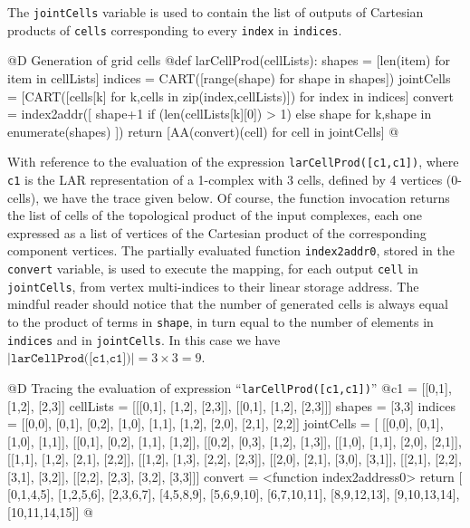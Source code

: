 \documentclass[11pt,oneside]{article}	%
\begin{document}
The \texttt{jointCells} variable is used to contain the list of outputs of Cartesian products of \texttt{cells} corresponding to every \texttt{index} in \texttt{indices}.

@D Generation of grid cells 
@{def larCellProd(cellLists):
    shapes = [len(item) for item in cellLists]
    indices = CART([range(shape) for shape in shapes])
    jointCells = [CART([cells[k] for k,cells in zip(index,cellLists)])
                  for index in indices]
    convert = index2addr([ shape+1 if (len(cellLists[k][0]) > 1) else shape
                             for k,shape in enumerate(shapes) ])
    return [AA(convert)(cell) for cell in jointCells]
@}

With reference to the evaluation of the expression \texttt{larCellProd([c1,c1])}, where \texttt{c1} is the LAR representation of a 1-complex with 3 cells, defined by 4 vertices (0-cells), we have the  trace given below.
Of course, the function invocation returns the list of cells of the topological product of the input complexes, each one expressed as a list of vertices of the Cartesian product of the corresponding component vertices. The partially evaluated function \texttt{index2addr0}, stored in the \texttt{convert} variable, is used to execute the mapping, for each output \texttt{cell} in \texttt{jointCells}, from vertex multi-indices to their linear storage address. The mindful reader should notice that the number of generated cells is always equal to the product of terms in \texttt{shape}, in turn equal to the number of elements in \texttt{indices} and in \texttt{jointCells}. In this case we have $|\texttt{larCellProd([c1,c1])}| = 3\times 3=9$.

@D Tracing the evaluation of expression ``\texttt{larCellProd([c1,c1])}''
@{c1 = [[0,1], [1,2], [2,3]]
cellLists = [[[0,1], [1,2], [2,3]], [[0,1], [1,2], [2,3]]]
shapes = [3,3]
indices = [[0,0], [0,1], [0,2], [1,0], [1,1], [1,2], [2,0], [2,1], [2,2]]
jointCells = [
 [[0,0], [0,1], [1,0], [1,1]],
 [[0,1], [0,2], [1,1], [1,2]],
 [[0,2], [0,3], [1,2], [1,3]],
 [[1,0], [1,1], [2,0], [2,1]],
 [[1,1], [1,2], [2,1], [2,2]],
 [[1,2], [1,3], [2,2], [2,3]],
 [[2,0], [2,1], [3,0], [3,1]],
 [[2,1], [2,2], [3,1], [3,2]],
 [[2,2], [2,3], [3,2], [3,3]]]
convert = <function index2address0>
return [
 [0,1,4,5],
 [1,2,5,6],
 [2,3,6,7],
 [4,5,8,9],
 [5,6,9,10],
 [6,7,10,11],
 [8,9,12,13],
 [9,10,13,14],
 [10,11,14,15]]
@}
\end{document}
